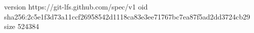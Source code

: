 version https://git-lfs.github.com/spec/v1
oid sha256:2c5e1f3d73a11ccf26958542d1118ca83e3ee71767bc7ea87f5ad2dd3724cb29
size 524384

